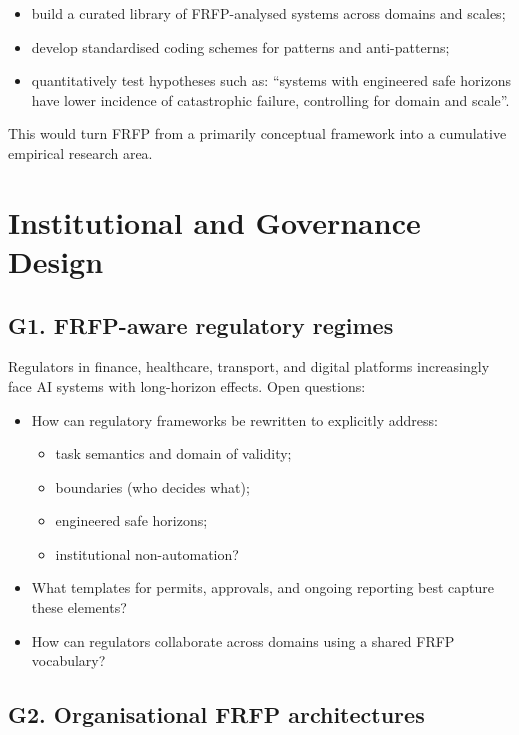 \begin{itemize}
  \item build a curated library of FRFP-analysed systems across
        domains and scales;
  \item develop standardised coding schemes for patterns and
        anti-patterns;
  \item quantitatively test hypotheses such as:
        ``systems with engineered safe horizons have lower incidence
        of catastrophic failure, controlling for domain and scale''.
\end{itemize}

This would turn FRFP from a primarily conceptual framework into a
cumulative empirical research area.

\section{Institutional and Governance Design}

\subsection{G1. FRFP-aware regulatory regimes}

Regulators in finance, healthcare, transport, and digital platforms
increasingly face AI systems with long-horizon effects.
Open questions:

\begin{itemize}
  \item How can regulatory frameworks be rewritten to explicitly
        address:
        \begin{itemize}
          \item task semantics and domain of validity;
          \item boundaries (who decides what);
          \item engineered safe horizons;
          \item institutional non-automation?
        \end{itemize}
  \item What templates for permits, approvals, and ongoing reporting
        best capture these elements?
  \item How can regulators collaborate across domains using a shared
        FRFP vocabulary?
\end{itemize}

\subsection{G2. Organisational FRFP architectures}

